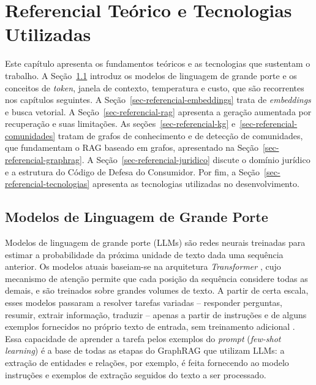 \chapter{Referencial Teórico e Tecnologias Utilizadas}
\label{sec-referencial}

Este capítulo apresenta os fundamentos teóricos e as tecnologias que sustentam o trabalho. A Seção~\ref{sec-referencial-llm} introduz os modelos de linguagem de grande porte e os conceitos de \textit{token}, janela de contexto, temperatura e custo, que são recorrentes nos capítulos seguintes. A Seção~\ref{sec-referencial-embeddings} trata de \textit{embeddings} e busca vetorial. A Seção~\ref{sec-referencial-rag} apresenta a geração aumentada por recuperação e suas limitações. As seções~\ref{sec-referencial-kg} e~\ref{sec-referencial-comunidades} tratam de grafos de conhecimento e de detecção de comunidades, que fundamentam o RAG baseado em grafos, apresentado na Seção~\ref{sec-referencial-graphrag}. A Seção~\ref{sec-referencial-juridico} discute o domínio jurídico e a estrutura do Código de Defesa do Consumidor. Por fim, a Seção~\ref{sec-referencial-tecnologias} apresenta as tecnologias utilizadas no desenvolvimento.

\section{Modelos de Linguagem de Grande Porte}
\label{sec-referencial-llm}

Modelos de linguagem de grande porte (LLMs) são redes neurais treinadas para estimar a probabilidade da próxima unidade de texto dada uma sequência anterior. Os modelos atuais baseiam-se na arquitetura \textit{Transformer} \cite{vaswani2017attention}, cujo mecanismo de atenção permite que cada posição da sequência considere todas as demais, e são treinados sobre grandes volumes de texto. A partir de certa escala, esses modelos passaram a resolver tarefas variadas -- responder perguntas, resumir, extrair informação, traduzir -- apenas a partir de instruções e de alguns exemplos fornecidos no próprio texto de entrada, sem treinamento adicional \cite{brown2020language}. Essa capacidade de aprender a tarefa pelos exemplos do \textit{prompt} (\textit{few-shot learning}) é a base de todas as etapas do GraphRAG que utilizam LLMs: a extração de entidades e relações, por exemplo, é feita fornecendo ao modelo instruções e exemplos de extração seguidos do texto a ser processado.

